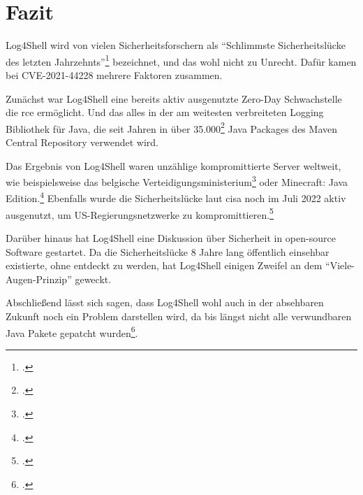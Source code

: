 
\section{Fazit}\label{sec:fazit}
Log4Shell wird von vielen Sicherheitsforschern als ``Schlimmste Sicherheitslücke des letzten Jahrzehnts''\footcite{guardianArticle} bezeichnet, und das wohl nicht zu Unrecht.
Dafür kamen bei CVE-2021-44228 mehrere Faktoren zusammen.

Zunächst war Log4Shell eine bereits aktiv ausgenutzte Zero-Day Schwachstelle die \gls{rce} ermöglicht.
Und das alles in der am weitesten verbreiteten Logging Bibliothek für Java, die seit Jahren in über 35.000\footcite{impact} Java Packages des Maven Central Repository verwendet wird.

\bigskip
Das Ergebnis von Log4Shell waren unzählige kompromittierte Server weltweit, wie beispielsweise das belgische Verteidigungsministerium\footcite{zdNet} oder Minecraft: Java Edition.\footcite{minecraftForum}
Ebenfalls wurde die Sicherheitslücke laut \gls{cisa} noch im Juli 2022 aktiv ausgenutzt, um US-Regierungsnetzwerke zu kompromittieren.\footcite{cisaAlert}

Darüber hinaus hat Log4Shell eine Diskussion über Sicherheit in open-source Software gestartet.
Da die Sicherheitslücke 8 Jahre lang öffentlich einsehbar existierte, ohne entdeckt zu werden, hat Log4Shell einigen Zweifel an dem ``Viele-Augen-Prinzip'' geweckt.

\bigskip
Abschließend lässt sich sagen, dass Log4Shell wohl auch in der absehbaren Zukunft noch ein Problem darstellen wird, da bis längst nicht alle verwundbaren Java Pakete gepatcht wurden\footcite{kaspersky}.
